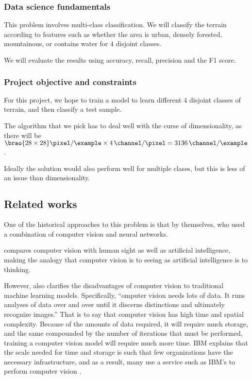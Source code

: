 \documentclass[11pt]{report}
\DeclarePairedDelimiter\brao()%
\begin{document}
\subsubsection{Data science fundamentals}

This problem involves multi-class classification.
We will classify the terrain according to features such as whether the area is
urban, densely forested, mountainous, or contains water
for \(4\) disjoint classes.

We will evaluate the results using
accuracy, recall, precision and the F1 score.

\subsubsection{Project objective and constraints}

For this project, we hope to train a model to learn different \(4\) disjoint classes of terrain, and then classify a test sample.

The algorithm that we pick has to deal well with the curse of dimensionality,
as there will be
\(
    \SI[parse-numbers=false]{\brao{28\times28}\!}{\pixel\per\example}
    \times \SI4{\channel\per\pixel}
    = \SI{3136}{\channel\per\example}
\).

Ideally the solution would also perform well for multiple clases,
but this is less of an issue than dimensionality.

\subsection{Related works}

One of the historical approaches to this problem is that by \textcite{Basu2015a} themselves,
who
used a combination of computer vision and neural networks.

\textcite{IBM2020a} compares computer vision with human sight as well as artificial intelligence,
making the analogy that computer vision is to seeing as artificial intelligence is to thinking.

However, \textcite{IBM2020a} also clarifies the disadvantages of computer vision to traditional machine learning models.
Specifically, ``omputer vision needs lots of data. It runs analyses of data over and over until it discerns distinctions and ultimately recognize images.''
That is to say that computer vision has high time and spatial complexity.
Because of the amounts of data required,
it will require much storage,
and the same compounded by the number of iterations that must be performed,
training a computer vision model will require much more time.
IBM explains that the scale needed for time and storage is such that few organizations have the necessary infrastructure,
and as a result, many use a service such as IBM's to perform computer vision \cite{IBM2020a}.
\end{document}
